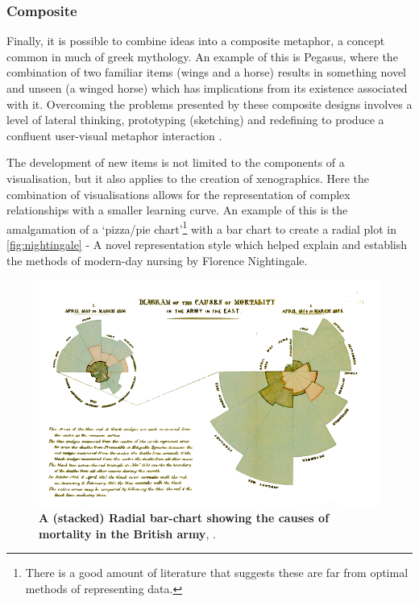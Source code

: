 \subsubsection{Composite}\label{sec:metcom}

Finally, it is possible to combine ideas into a composite metaphor, a concept common in much of greek mythology. An example of this is Pegasus, where the combination of two familiar items (wings and a horse) results in something novel and unseen (a winged horse) which has implications from its existence associated with it.
Overcoming the problems presented by these composite designs involves a level of lateral thinking, prototyping (sketching) and redefining to produce a confluent user-visual metaphor interaction \citep{shapinginfo,fds}.


%

The development of new items is not limited to the components of a visualisation, but it also applies to the creation of xenographics. Here the combination of visualisations allows for the representation of complex relationships with a smaller learning curve. An example of this is the amalgamation of a  `pizza/pie chart'\footnote{There is a good amount of literature that suggests these are far from optimal methods of representing data. } with a bar chart to create a radial plot in \autoref{fig:nightingale} - A novel representation style which helped explain and establish the methods of modern-day nursing by Florence Nightingale.



\begin{figure}[H]
     \centering
         \includegraphics[width=.8\textwidth]{figures_c1/nightingale.png}
        \caption[Caption for LOF]{\textbf{A (stacked) Radial bar-chart showing the causes of mortality in the British army}\protect\footnotemark , \citep{nightingale}.}
        \label{fig:nightingale}
\end{figure}




